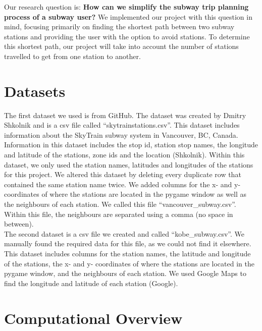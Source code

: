\documentclass[fontsize=11pt]{article}
\begin{document}
Our research question is: \textbf{How can we simplify the subway trip planning process of a subway user?} We implemented our project with this question in mind, focusing primarily on finding the shortest path between two subway stations and providing the user with the option to avoid stations. To determine this shortest path, our project will take into account the number of stations travelled to get from one station to another.

\bigskip

\section*{Datasets}

The first dataset we used is from GitHub. The dataset was created by Dmitry Shkolnik and is a csv file called “skytrainstations.csv”. This dataset includes information about the SkyTrain subway system in Vancouver, BC, Canada. Information in this dataset includes the stop id, station stop names, the longitude and latitude of the stations, zone ids and the location (Shkolnik). Within this dataset, we only used the station names, latitudes and longitudes of the stations for this project. We altered this dataset by deleting every duplicate row that contained the same station name twice. We added columns for the x- and y-coordinates of where the stations are located in the pygame window as well as the neighbours of each station. We called this file ``vancouver\_subway.csv”. Within this file, the neighbours are separated using a comma (no space in between). \\

The second dataset is a csv file we created and called ``kobe\_subway.csv”. We manually found the required data for this file, as we could not find it elsewhere. This dataset includes columns for the station names, the latitude and longitude of the stations, the x- and y- coordinates of where the stations are located in the pygame window, and the neighbours of each station.  We used Google Maps to find the longitude and latitude of each station (Google). 

\bigskip\bigskip

\section*{Computational Overview} 
\end{document}
